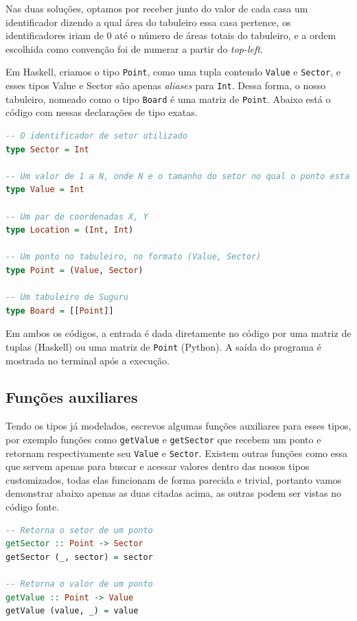 \documentclass[12pt]{article}
\begin{document}
Nas duas soluções, optamos por receber junto do valor de cada casa um identificador dizendo a qual área do tabuleiro essa casa pertence, os identificadores iriam de 0 até o número de áreas totais do tabuleiro, e a ordem escolhida como convenção foi de numerar a partir do \emph{top-left}. 

Em Haskell, criamos o tipo \texttt{Point}, como uma tupla contendo \texttt{Value} e \texttt{Sector}, e esses tipos Value e Sector são apenas \emph{aliases} para \texttt{Int}. Dessa forma, o nosso tabuleiro, nomeado como o tipo \texttt{Board} é uma matriz de \texttt{Point}. Abaixo está o código com nessas declarações de tipo exatas.

\begin{lstlisting}[language=Haskell]
-- O identificador de setor utilizado
type Sector = Int

-- Um valor de 1 a N, onde N e o tamanho do setor no qual o ponto esta
type Value = Int

-- Um par de coordenadas X, Y
type Location = (Int, Int)

-- Um ponto no tabuleiro, no formato (Value, Sector)
type Point = (Value, Sector)

-- Um tabuleiro de Suguru
type Board = [[Point]]
\end{lstlisting}

Em ambos os códigos, a entrada é dada diretamente no código por uma matriz de tuplas (Haskell) ou uma matriz de \texttt{Point} (Python). A saída do programa é mostrada no terminal após a execução. 

\subsection{Funções auxiliares}

Tendo os tipos já modelados, escrevos algumas funções auxiliares para esses tipos, por exemplo funções como \texttt{getValue} e \texttt{getSector} que recebem um ponto e retornam respectivamente seu \texttt{Value} e \texttt{Sector}. Existem outras funções como essa que servem apenas para buscar e acessar valores dentro das nossos tipos customizados, todas elas funcionam de forma parecida e trivial, portanto vamos demonstrar abaixo apenas as duas citadas acima, as outras podem ser vistas no código fonte.

\begin{lstlisting}[language=Haskell]
-- Retorna o setor de um ponto
getSector :: Point -> Sector
getSector (_, sector) = sector

-- Retorna o valor de um ponto
getValue :: Point -> Value
getValue (value, _) = value
\end{lstlisting}
\end{document}
